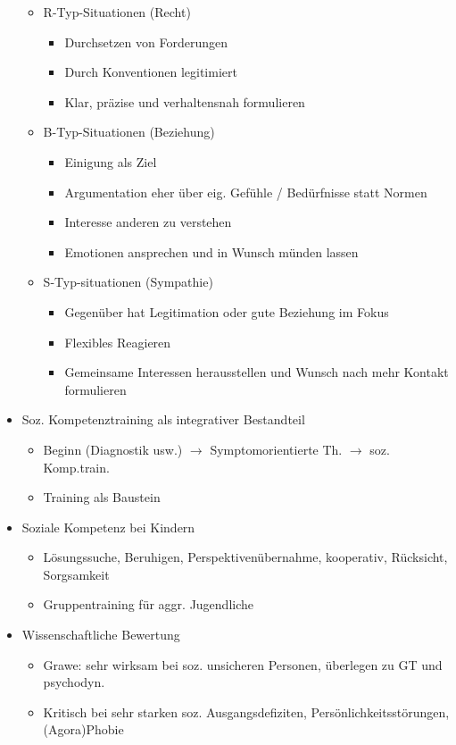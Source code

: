 \documentclass[11pt, paper=a4, twocolumn]{scrartcl}
\begin{document}
\begin{itemize}
\begin{itemize}
\begin{itemize}
						\end{itemize}
					\item R-Typ-Situationen (Recht)
						\begin{itemize}
							\item Durchsetzen von Forderungen
							\item Durch Konventionen legitimiert
							\item Klar, präzise und verhaltensnah formulieren
						\end{itemize}
					\item B-Typ-Situationen (Beziehung)
						\begin{itemize}
							\item Einigung als Ziel
							\item Argumentation eher über eig. Gefühle / Bedürfnisse statt Normen
							\item Interesse anderen zu verstehen
							\item Emotionen ansprechen und in Wunsch münden lassen
						\end{itemize}
					\item S-Typ-situationen (Sympathie)
						\begin{itemize}
							\item Gegenüber hat Legitimation oder gute Beziehung im Fokus
							\item Flexibles Reagieren
							\item Gemeinsame Interessen herausstellen und Wunsch nach mehr Kontakt formulieren
						\end{itemize}

				\end{itemize}
			\item Soz. Kompetenztraining als integrativer Bestandteil
				\begin{itemize}
					\item Beginn (Diagnostik usw.) $\rightarrow$ Symptomorientierte Th. $\rightarrow$ soz. Komp.train.
					\item Training als Baustein
				\end{itemize}
			\item Soziale Kompetenz bei Kindern
				\begin{itemize}
					\item Lösungssuche, Beruhigen, Perspektivenübernahme, kooperativ, Rücksicht, Sorgsamkeit
					\item Gruppentraining für aggr. Jugendliche
				\end{itemize}
			\item Wissenschaftliche Bewertung
				\begin{itemize}
					\item Grawe: sehr wirksam bei soz. unsicheren Personen, überlegen zu GT und psychodyn.
					\item Kritisch bei sehr starken soz. Ausgangsdefiziten, Persönlichkeitsstörungen, (Agora)Phobie
				\end{itemize}
		\end{itemize}
\end{document}
